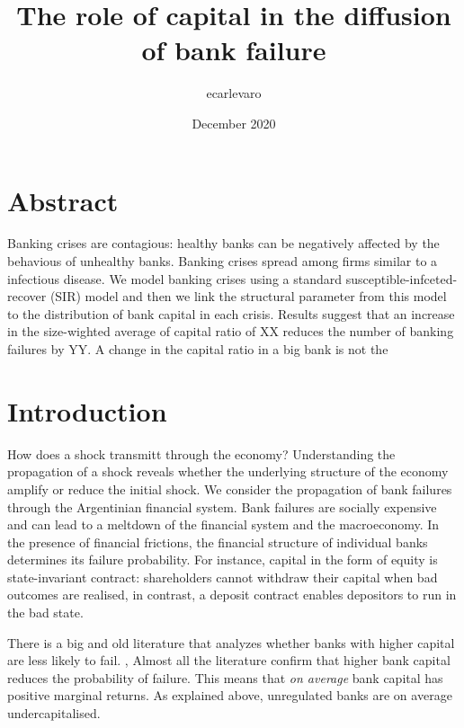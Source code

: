 \documentclass[11pt,final]{article}%
\title{The role of capital in the diffusion of bank failure}
\author{ecarlevaro }
\date{December 2020}
\begin{document}
\maketitle

\section{Abstract}
Banking crises are contagious: healthy banks can be negatively affected by the behavious of unhealthy banks. Banking crises spread among firms similar to a infectious disease. We model banking crises using a standard susceptible-infceted-recover (SIR) model and then we link the structural parameter from this model to the distribution of bank capital in each crisis. Results suggest that an increase in the size-wighted average of capital ratio of XX reduces the number of banking failures by YY. A change in the capital ratio in a big bank is not the 

\section{Introduction}
How does a shock transmitt through the economy? Understanding the propagation of a shock reveals whether the underlying structure of the economy amplify or reduce the initial shock. We consider the propagation of bank failures through the Argentinian financial system.
Bank failures are socially expensive and can lead to a meltdown of the financial system and the macroeconomy. 
In the presence of financial frictions, the financial structure of individual banks determines its failure probability. For instance, capital in the form of equity is state-invariant contract: shareholders cannot withdraw their capital when bad outcomes are realised, in contrast, a deposit contract enables depositors to run in the bad state. 

There is a big and old literature that analyzes whether banks with higher capital are less likely to fail. ,  Almost all the literature confirm that higher bank capital reduces the probability of failure. This means that \textit{on average} bank capital has positive marginal returns. As explained above, unregulated banks are on average undercapitalised.
\end{document}
